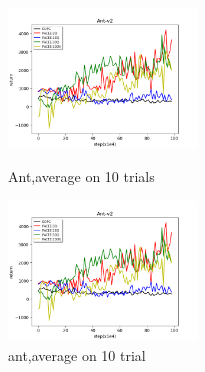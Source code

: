 \documentclass{article}
\begin{document}
    \begin{figure}[htbp]
      \centering
      \includegraphics[width=5cm]{ant}
      \caption{Ant,average on 10 trials}\label{Ant}
      \includegraphics[width=5cm]{ant}
      \caption{ant,average on 10 trial}\label{Ant2}%
    \end{figure}
\end{document}
